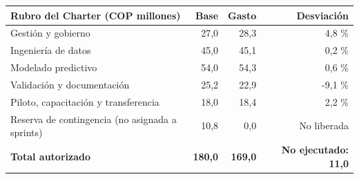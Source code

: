 \footnotesize
\begin{tabularx}{\linewidth}{X r r r}
\toprule
\textbf{Rubro del Charter (COP millones)} & \textbf{Base} & \textbf{Gasto} & \textbf{Desviación} \\
\midrule
Gestión y gobierno & 27,0 & 28,3 & 4,8 \% \\
Ingeniería de datos & 45,0 & 45,1 & 0,2 \% \\
Modelado predictivo & 54,0 & 54,3 & 0,6 \% \\
Validación y documentación & 25,2 & 22,9 & -9,1 \% \\
Piloto, capacitación y transferencia & 18,0 & 18,4 & 2,2 \% \\
Reserva de contingencia (no asignada a sprints) & 10,8 & 0,0 & No liberada \\
\textbf{Total autorizado} & \textbf{180,0} & \textbf{169,0} & \textbf{No ejecutado: 11,0} \\
\bottomrule
\end{tabularx}
